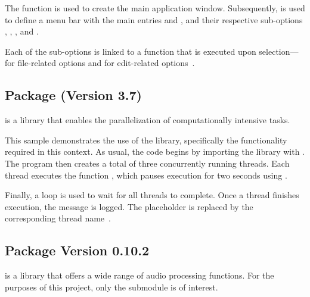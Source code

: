 The  function is used to create the main application window.  
Subsequently,  is used to define a menu bar with the main entries  and , and their respective sub-options , , , and .

Each of the sub-options is linked to a function that is executed upon selection— for file-related options and  for edit-related options~\cite{Sach:2020}.


\subsection{Package  (Version 3.7)}

 is a library that enables the parallelization of computationally intensive tasks.

\begin{code}[!htp]
	\caption{Simple multithreading example with logging in Python} 
	\label{Code:Python:File:ThreadLoggingExample}
\end{code}

This sample demonstrates the use of the  library, specifically the functionality required in this context.  
As usual, the code begins by importing the library with .  
The program then creates a total of three concurrently running threads.  
Each thread executes the function , which pauses execution for two seconds using .

Finally, a  loop is used to wait for all threads to complete.  
Once a thread finishes execution, the message  is logged.  
The placeholder  is replaced by the corresponding thread name~\cite{Python:2024Threading}.


\subsection{Package  Version 0.10.2}

 is a library that offers a wide range of audio processing functions.  
For the purposes of this project, only the submodule  is of interest.

\begin{code}[!htp]
	\caption{Demonstrates time-stretching effects using Librosa to modify audio speed} 
	\label{Code:Python:File:TimeStretchingLibrosa}
\end{code}

